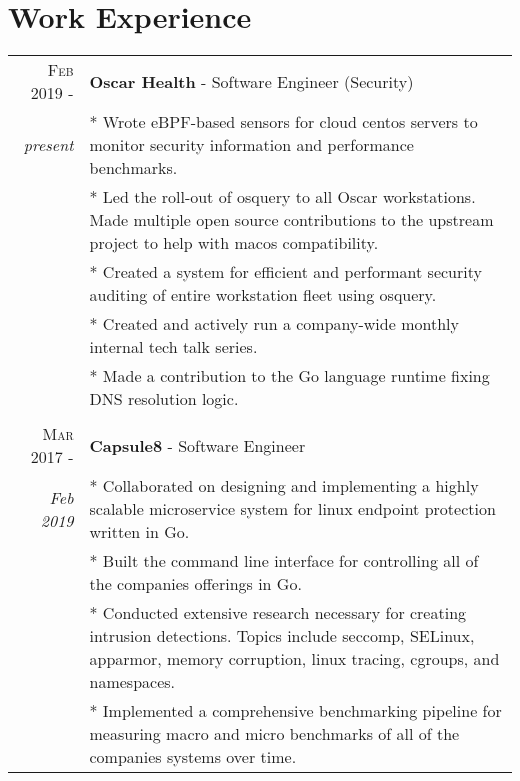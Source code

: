 \documentclass[a4paper,10pt]{article}
\begin{document}
\section{Work Experience}
\begin{tabular}{rp{11cm}}

 \textsc{Feb 2019 -} & \textbf{Oscar Health} - Software Engineer (Security)\\\emph{present}
&\footnotesize{
    * Wrote eBPF-based sensors for cloud centos servers to monitor security information and performance benchmarks.
 }\\

 
&\footnotesize{
    * Led the roll-out of osquery to all Oscar workstations. Made multiple open source contributions to the upstream project to help with macos compatibility.
}\\
 
&\footnotesize{
    * Created a system for efficient and performant security auditing of entire workstation fleet using osquery.
}\\
 
&\footnotesize{
    * Created and actively run a company-wide monthly internal tech talk series.
}\\

 
&\footnotesize{
    * Made a contribution to the Go language runtime fixing DNS resolution logic.
}\\

\\
 \textsc{Mar 2017 -} & \textbf{Capsule8} - Software Engineer \\\emph{Feb 2019}
 &\footnotesize{
    * Collaborated on designing and implementing a highly scalable microservice system for linux endpoint protection written in Go.
 }\\
 
 &\footnotesize{
    *  Built the command line interface for controlling all of the companies offerings in Go.
 }\\
 
  &\footnotesize{
    * Conducted extensive research necessary for creating intrusion detections. Topics include seccomp, SELinux, apparmor, memory corruption, linux tracing, cgroups, and namespaces.
 }\\
 
 &\footnotesize{
    * Implemented a comprehensive benchmarking pipeline for measuring macro and micro benchmarks of all of the companies systems over time.
 }\\
 

\end{tabular}
\end{document}
